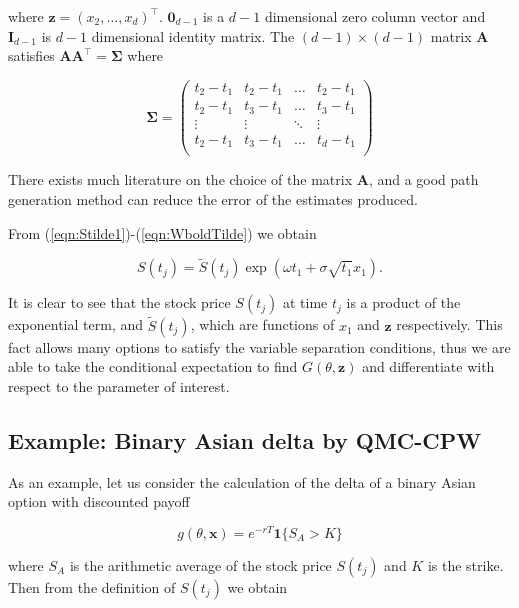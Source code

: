 where $\boldsymbol{z} = (x_2,\dots,x_d)^\top$. $\boldsymbol{0}_{d-1}$ is a $d-1$ dimensional zero column vector and $\boldsymbol{I}_{d-1}$ is $d-1$ dimensional identity matrix. The $(d-1) \times (d-1)$ matrix $\boldsymbol{A}$ satisfies $\boldsymbol{AA}^\top = \boldsymbol{\Sigma}$ where

\begin{equation*}
    \boldsymbol{\Sigma} = 
    \begin{pmatrix}
    t_2 - t_1 & t_2 - t_1 & \dots & t_2 - t_1 \\
    t_2 - t_1 & t_3 - t_1 & \dots & t_3 - t_1 \\
    \vdots & \vdots & \ddots & \vdots \\
    t_2 - t_1 & t_3 - t_1 & \dots & t_d - t_1 \\
    \end{pmatrix}
\end{equation*}

There exists much literature on the choice of the matrix $\boldsymbol{A}$, and a good path generation method can reduce the error of the estimates produced.

From (\ref{eqn:Stilde1})-(\ref{eqn:WboldTilde}) we obtain

\begin{equation} \label{eqn:StjFinal}
    S(t_j) = \widetilde{S}(t_j)\exp{(\omega t_1 + \sigma \sqrt{t_1}x_1)}.
\end{equation}

It is clear to see that the stock price $S(t_j)$ at time $t_j$ is a product of the exponential term, and $\widetilde{S}(t_j)$, which are functions of $x_1$ and $\boldsymbol{z}$ respectively. This fact allows many options to satisfy the variable separation conditions, thus we are able to take the conditional expectation to find $G(\theta,\boldsymbol{z})$ and differentiate with respect to the parameter of interest.

\subsection{Example: Binary Asian delta by QMC-CPW} \label{sec:BaDeltaExample}
As an example, let us consider the calculation of the delta of a binary Asian option with discounted payoff

\begin{equation}
    g(\theta,\boldsymbol{x}) = e^{-rT}\boldsymbol{1}\{S_A > K\}
\end{equation}

where $S_A$ is the arithmetic average of the stock price $S(t_j)$ and $K$ is the strike. Then from the definition of $S(t_j)$ we obtain

